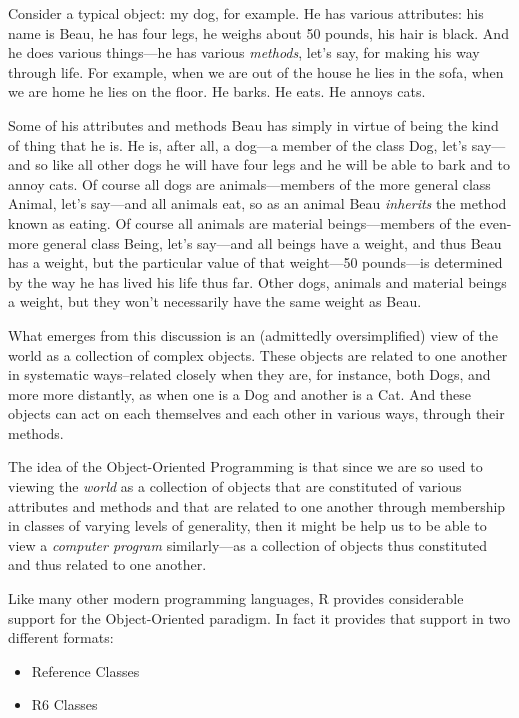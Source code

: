 \documentclass[]{book}
\providecommand{\tightlist}{%
  \setlength{\itemsep}{0pt}\setlength{\parskip}{0pt}}
\theoremstyle{definition}
\theoremstyle{definition}
\theoremstyle{remark}
\begin{document}
{Consider a typical object: my dog, for example. He has various
attributes: his name is Beau, he has four legs, he weighs about 50
pounds, his hair is black. And he does various things---he has various
\emph{methods}, let's say, for making his way through life. For example,
when we are out of the house he lies in the sofa, when we are home he
lies on the floor. He barks. He eats. He annoys cats. 

Some of his attributes and methods Beau has simply in virtue of being
the kind of thing that he is. He is, after all, a dog---a member of the
class Dog, let's say---and so like all other dogs he will have four legs
and he will be able to bark and to annoy cats. Of course all dogs are
animals---members of the more general class Animal, let's say---and all
animals eat, so as an animal Beau \emph{inherits} the
method known as eating. Of course all animals are material
beings---members of the even-more general class Being, let's say---and
all beings have a weight, and thus Beau has a weight, but the particular
value of that weight---50 pounds---is determined by the way he has lived
his life thus far. Other dogs, animals and material beings a weight, but
they won't necessarily have the same weight as Beau.

What emerges from this discussion is an (admittedly oversimplified) view
of the world as a collection of complex objects. These objects are
related to one another in systematic ways--related closely when they
are, for instance, both Dogs, and more more distantly, as when one is a
Dog and another is a Cat. And these objects can act on each themselves
and each other in various ways, through their methods.

The idea of the Object-Oriented Programming is that since we are so used
to viewing the \emph{world} as a collection of objects that are
constituted of various attributes and methods and that are related to
one another through membership in classes of varying levels of
generality, then it might be help us to be able to view a \emph{computer
program} similarly---as a collection of objects thus constituted and
thus related to one another.

Like many other modern programming languages, R provides considerable
support for the Object-Oriented paradigm. In fact it provides that
support in two different formats:

\begin{itemize}
\tightlist
\item
  Reference Classes
\item
  R6 Classes
\end{itemize}

}
\end{document}
